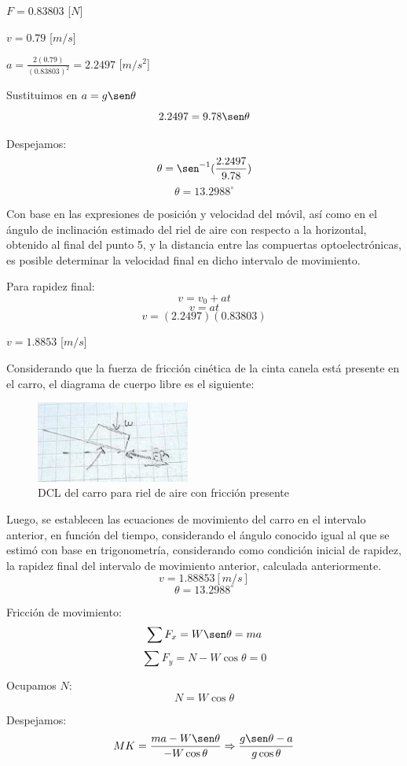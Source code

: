 \documentclass[12pt, titlepage]{report}
\begin{document}
    \centerline{$F = 0.83803$ [$N$]}
    \centerline{$v = 0.79$ [$m/s$]}
    \centerline{$a = \frac{2(0.79)}{(0.83803)^2} = 2.2497$ [$m/s^2$]}

    Sustituimos en $a = g\sen\theta$
    $$2.2497 = 9.78\sen\theta$$

    Despejamos:
    $$\theta = \sen^{-1} (\frac{2.2497}{9.78})$$
    $$\theta = 13.2988^\circ$$

    Con base en las expresiones de posición y velocidad del móvil, así como en el ángulo de inclinación estimado del riel de aire con respecto a la horizontal, obtenido al final del punto 5, y la distancia entre las compuertas optoelectrónicas, es posible determinar la velocidad final en dicho intervalo de movimiento.

    Para rapidez final:
    $$v = v_0 + at$$
    $$v = at$$
    $$v = (2.2497)(0.83803)$$
    \centerline{$v = 1.8853$ [$m/s$]}

    Considerando que la fuerza de fricción cinética de la cinta canela está presente en el carro, el diagrama de cuerpo libre es el siguiente:

    \begin{figure}[ht]
        \centering
        \includegraphics[width=0.45\textwidth]{DCL_E22.png}
        \caption{DCL del carro para riel de aire con fricción presente}
    \end{figure}

    Luego, se establecen las ecuaciones de movimiento del carro en el intervalo anterior, en función del tiempo, considerando el ángulo conocido igual al que se estimó con base en trigonometría, considerando como condición inicial de rapidez, la rapidez final del intervalo de movimiento anterior, calculada anteriormente.
    $$v = 1.88853 [m/s]$$
    $$\theta = 13.2988^\circ$$
    
    Fricción de movimiento: 
    $$\sum F_x = W\sen\theta = ma$$
    $$\sum F_y = N - W\cos\theta = 0$$

    Ocupamos $N$:
    $$N = W\cos\theta$$

    Despejamos:
    $$MK = \frac{ma - W\sen\theta}{-W\cos\theta} \Rightarrow \frac{g\sen\theta - a}{g\cos\theta}$$
\end{document}
